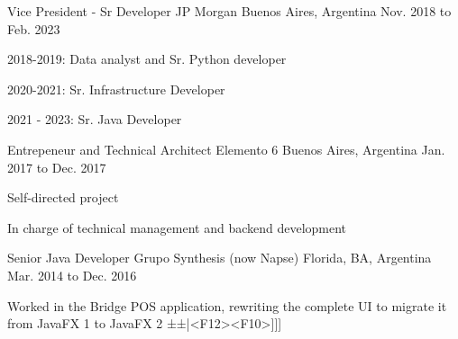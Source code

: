 


\begin{cventries}


	\cventry
	{Vice President - Sr Developer} %
	{JP Morgan} %
	{Buenos Aires, Argentina} %
	{Nov. 2018 to Feb. 2023} %
	{ %
		\begin{cvitems}
			\item {2018-2019: Data analyst and Sr. Python developer}
			\item {2020-2021: Sr. Infrastructure Developer}
			\item {2021 - 2023: Sr. Java Developer}
		\end{cvitems}
	}


	\cventry
	{Entrepeneur and Technical Architect} %
	{Elemento 6} %
	{Buenos Aires, Argentina} %
	{Jan. 2017 to Dec. 2017} %
	{ %
		\begin{cvitems}
			\item {Self-directed project}
			\item {In charge of technical management and backend development}
		\end{cvitems}
	}


	\cventry
	{Senior Java Developer} %
	{Grupo Synthesis (now Napse)} %
	{Florida, BA, Argentina} %
	{Mar. 2014 to Dec. 2016} %
	{ %
		\begin{cvitems}
			\item {Worked in the Bridge POS application, rewriting the complete UI to migrate it from JavaFX 1 to JavaFX 2 }
			±±|<F12><F10>]]]
		\end{cvitems}
	}


\end{cventries}
